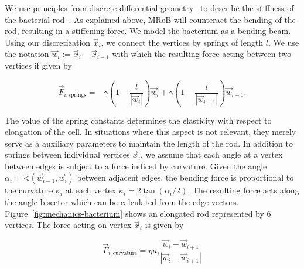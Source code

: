 \documentclass[10pt,letterpaper]{article}
\begin{document}
We use principles from discrete differential geometry~\cite{bobenko2008discrete} to describe the
stiffness of the bacterial rod~\cite{Amir2014_2}.
As explained above, MReB will counteract the bending of the rod, resulting in a stiffening force.
We model the bacterium as a bending beam.
Using our discretization $\vec{x}_i$, we connect the vertices by springs of length $l$.
We use the notation $\vec{w}_i:=\vec{x}_i-\vec{x}_{i-1}$ with which the resulting force acting
between two vertices if given by

\begin{equation}
    \vec{F}_{i,\text{springs}} =
        -\gamma\left(1 - \frac{l}{\left|\vec{w}_i\right|}\right) \vec{w}_i
        + \gamma\left(1 - \frac{l}{\left|\vec{w}_{i+1}\right|}\right) \vec{w}_{i+1}.
\end{equation}

The value of the spring constants determines the elasticity with respect to elongation of the cell.
In situations where this aspect is not relevant, they merely serve as a auxiliary parameters to
maintain the length of the rod.
In addition to springs between individual vertices $\vec{x}_i$, we assume that each angle at a
vertex between edges is subject to a force indiced by curvature.
Given the angle $\alpha_i = \sphericalangle(\vec{w}_{i-1},\vec{w}_i)$ between adjacent edges,
the bending force is proportional to the curvature $\kappa_i$ at each vertex
$\kappa_i = 2\tan(\alpha_i/2)$.
The resulting force acts along the angle bisector which can be calculated from the edge vectors.
Figure~\ref{fig:mechanics-bacterium} shows an elongated rod represented by $6$ vertices.
The force acting on vertex $\vec{x}_i$ is given by

\begin{equation}
    \vec{F}_{i,\text{curvature}} = \eta\kappa_i
        \frac{\vec{w}_i - \vec{w}_{i+1}}{|\vec{w}_i-\vec{w}_{i+1}|}
\end{equation}
\end{document}
